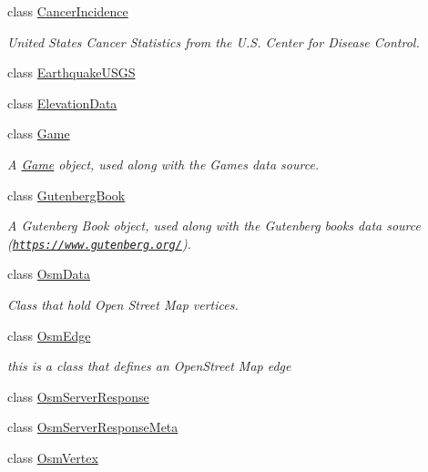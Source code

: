 \begin{DoxyCompactItemize}
class \hyperlink{classbridges_1_1data__src__dependent_1_1_cancer_incidence}{Cancer\+Incidence}
\begin{DoxyCompactList}\small\item\em United States Cancer Statistics from the U.\+S. Center for Disease Control. \end{DoxyCompactList}\item 
class \hyperlink{classbridges_1_1data__src__dependent_1_1_earthquake_u_s_g_s}{Earthquake\+U\+S\+GS}
\item 
class \hyperlink{classbridges_1_1data__src__dependent_1_1_elevation_data}{Elevation\+Data}
\item 
class \hyperlink{classbridges_1_1data__src__dependent_1_1_game}{Game}
\begin{DoxyCompactList}\small\item\em A \hyperlink{classbridges_1_1data__src__dependent_1_1_game}{Game} object, used along with the Games data source. \end{DoxyCompactList}\item 
class \hyperlink{classbridges_1_1data__src__dependent_1_1_gutenberg_book}{Gutenberg\+Book}
\begin{DoxyCompactList}\small\item\em A Gutenberg Book object, used along with the Gutenberg books data source (\href{https://www.gutenberg.org/}{\tt https\+://www.\+gutenberg.\+org/}). \end{DoxyCompactList}\item 
class \hyperlink{classbridges_1_1data__src__dependent_1_1_osm_data}{Osm\+Data}
\begin{DoxyCompactList}\small\item\em Class that hold Open Street Map vertices. \end{DoxyCompactList}\item 
class \hyperlink{classbridges_1_1data__src__dependent_1_1_osm_edge}{Osm\+Edge}
\begin{DoxyCompactList}\small\item\em this is a class that defines an Open\+Street Map edge \end{DoxyCompactList}\item 
class \hyperlink{classbridges_1_1data__src__dependent_1_1_osm_server_response}{Osm\+Server\+Response}
\item 
class \hyperlink{classbridges_1_1data__src__dependent_1_1_osm_server_response_meta}{Osm\+Server\+Response\+Meta}
\item 
class \hyperlink{classbridges_1_1data__src__dependent_1_1_osm_vertex}{Osm\+Vertex}

\end{DoxyCompactItemize}
